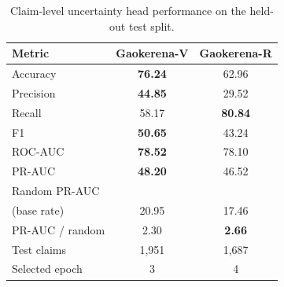 \documentclass[review]{elsarticle}
\begin{document}
\begin{table}[ht]
\centering
\begin{tabular}{|l|c|c|}
\hline
\textbf{Metric} & \textbf{Gaokerena-V} & \textbf{Gaokerena-R} \\ \hline
Accuracy & \textbf{76.24} & 62.96 \\ \hline
Precision & \textbf{44.85} & 29.52 \\ \hline
Recall & 58.17 & \textbf{80.84} \\ \hline
F1 & \textbf{50.65} & 43.24 \\ \hline
ROC-AUC & \textbf{78.52} & 78.10 \\ \hline
PR-AUC & \textbf{48.20} & 46.52 \\ \hline
Random PR-AUC & & \\
(base rate) & 20.95 & 17.46 \\ \hline
PR-AUC / random & 2.30 & \textbf{2.66} \\ \hline
Test claims & 1{,}951 & 1{,}687 \\ \hline
Selected epoch & 3 & 4 \\ \hline
\end{tabular}
\caption{Claim-level uncertainty head performance on the held-out test split.}
\label{tab:uhead_results}
\end{table}
\end{document}
